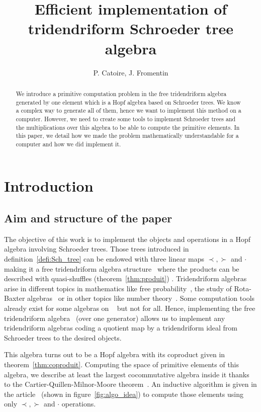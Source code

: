 \documentclass[a4paper,10pt]{amsart}
\title{Efficient implementation of tridendriform Schroeder tree algebra}
\author{P. Catoire, J. Fromentin}
\newcommand{\Schw}{Schroeder} %
\theoremstyle{definition}
\begin{document}
\maketitle

\begin{abstract}
	We introduce a primitive computation problem in the free tridendriform algebra generated by one element which is a Hopf algebra based on \Schw{} trees. We know a complex way to generate all of them, hence we want to implement this method on a computer. However, we need to create some tools to implement Schroeder trees and the multiplications over this algebra to be able to compute the primitive elements. In this paper, we detail how we made the problem mathematically understandable for a computer and how we did implement it.
\end{abstract}

\section{Introduction}

\subsection{Aim and structure of the paper}

The objective of this work  is to implement the objects and operations in a Hopf algebra involving \Schw{} trees. Those trees introduced in definition~\ref{defi:Sch_tree} can be endowed with three linear maps $\prec, \succ$ and $\cdot$ making it a free tridendriform algebra structure~\cite{LodayRonco_98,Catoire_2023, Manchon_2020} where the products can be described with quasi-shuffles (theorem~\ref{thm:produit}) . 
Tridendriform algebras arise in different topics in mathematics like free probability~\cite{Celestino_2022, Ebrahimi-Fard_Patras_2018}, the study of Rota-Baxter algebras~\cite{Manchon_RB_2020, Gao_2019} or in other topics like number theory~\cite{Ho00, Catoire_2025}.
Some computation tools already exist for some algebras on \Sage{}~\cite{Sage_book,Sage_doc} but not for all. 
Hence, implementing the free tridendriform algebra~\cite{Catoire_2023} (over one generator) allows us to implement any tridendriform algebras coding a quotient map by a tridendriform ideal from \Schw{} trees to the desired objects.

This algebra turns out to be a Hopf algebra with its coproduct given in theorem~\ref{thm:coproduit}. Computing the space of primitive elements of this algebra, we describe at least the largest cocommutative algebra inside it thanks to the Cartier-Quillen-Milnor-Moore theorem~\cite{May_69,MilnorMoore_65, CartierPatras_2021}. An inductive algorithm is given in the article~\cite{Catoire_2023} (shown in figure~\ref{fig:algo_idea}) to compute those elements using only $\prec, \succ$ and $\cdot$ operations.  
\end{document}

